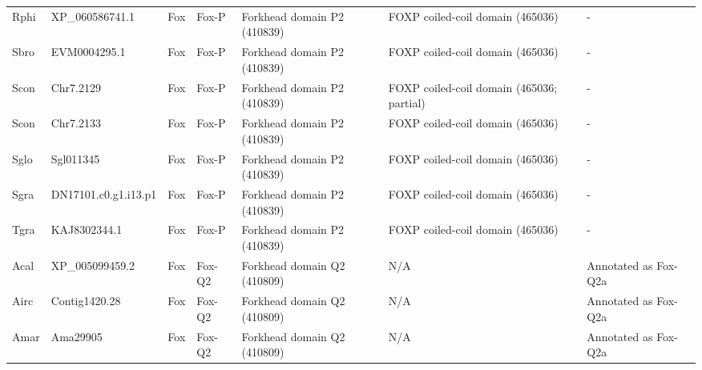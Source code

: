 \documentclass[../main.tex]{subfiles}
\begin{document}
\begin{landscape}
\begin{longtable}{lllllll}
		Rphi           & XP\_060586741.1       & Fox            & Fox-P               & Forkhead domain P2 (410839)                 & FOXP coiled-coil domain (465036)                                       & -                    \\
		Sbro           & EVM0004295.1          & Fox            & Fox-P               & Forkhead domain P2 (410839)                 & FOXP coiled-coil domain (465036)                                       & -                    \\
		Scon           & Chr7.2129             & Fox            & Fox-P               & Forkhead domain P2 (410839)                 & FOXP coiled-coil domain (465036; partial)                              & -                    \\
		Scon           & Chr7.2133             & Fox            & Fox-P               & Forkhead domain P2 (410839)                 & FOXP coiled-coil domain (465036)                                       & -                    \\
		Sglo           & Sgl011345             & Fox            & Fox-P               & Forkhead domain P2 (410839)                 & FOXP coiled-coil domain (465036)                                       & -                    \\
		Sgra           & DN17101.c0.g1.i13.p1  & Fox            & Fox-P               & Forkhead domain P2 (410839)                 & FOXP coiled-coil domain (465036)                                       & -                    \\
		Tgra           & KAJ8302344.1          & Fox            & Fox-P               & Forkhead domain P2 (410839)                 & FOXP coiled-coil domain (465036)                                       & -                    \\
		Acal           & XP\_005099459.2       & Fox            & Fox-Q2              & Forkhead domain Q2 (410809)                 & N/A                                                                    & Annotated as Fox-Q2a \\
		Airc           & Contig1420.28         & Fox            & Fox-Q2              & Forkhead domain Q2 (410809)                 & N/A                                                                    & Annotated as Fox-Q2a \\
		Amar           & Ama29905              & Fox            & Fox-Q2              & Forkhead domain Q2 (410809)                 & N/A                                                                    & Annotated as Fox-Q2a \\

\end{longtable}
\end{landscape}
\end{document}
